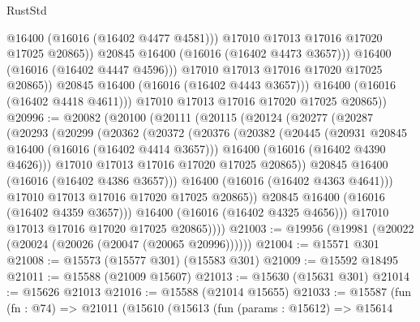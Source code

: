 \begin{lexlean}{RustStd}
\begin{coremodule}
                          @16400
                          (@16016 (@16402 @4477 @4581)))
                        @17010
                        @17013
                        @17016
                        @17020
                        @17025
                        @20865))
                    @20845
                    @16400
                    (@16016 (@16402 @4473 @3657)))
                  @16400
                  (@16016 (@16402 @4447 @4596)))
                @17010
                @17013
                @17016
                @17020
                @17025
                @20865))
            @20845
            @16400
            (@16016 (@16402 @4443 @3657)))
          @16400
          (@16016 (@16402 @4418 @4611)))
        @17010
        @17013
        @17016
        @17020
        @17025
        @20865))
@20996 := @20082
    (@20100
      (@20111
        (@20115
          (@20124
            (@20277
              (@20287
                (@20293
                  (@20299
                    (@20362
                      (@20372
                        (@20376
                          (@20382
                            (@20445
                              (@20931 @20845 @16400 (@16016 (@16402 @4414 @3657)))
                              @16400
                              (@16016 (@16402 @4390 @4626)))
                            @17010
                            @17013
                            @17016
                            @17020
                            @17025
                            @20865))
                        @20845
                        @16400
                        (@16016 (@16402 @4386 @3657)))
                      @16400
                      (@16016 (@16402 @4363 @4641)))
                    @17010
                    @17013
                    @17016
                    @17020
                    @17025
                    @20865))
                @20845
                @16400
                (@16016 (@16402 @4359 @3657)))
              @16400
              (@16016 (@16402 @4325 @4656)))
            @17010
            @17013
            @17016
            @17020
            @17025
            @20865))))
@21003 := @19956 (@19981 (@20022 (@20024 (@20026 (@20047 (@20065 @20996))))))
@21004 := @15571 @301
@21008 := @15573 (@15577 @301) (@15583 @301)
@21009 := @15592 @18495
@21011 := @15588 (@21009 @15607)
@21013 := @15630 (@15631 @301)
@21014 := @15626 @21013
@21016 := @15588 (@21014 @15655)
@21033 := @15587
    (fun (fn : @74) =>
    @21011
      (@15610
        (@15613
          (fun (params : @15612) =>
          @15614

\end{coremodule}
\end{lexlean}
